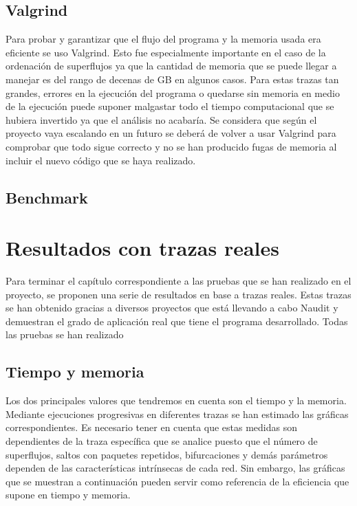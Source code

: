 \documentclass[twoside, 12pt]{epstfg}
\begin{document}
\subsection{Valgrind}
Para probar y garantizar que el flujo del programa y la memoria usada era eficiente se uso Valgrind. Esto fue especialmente importante en el caso de la ordenación de superflujos ya que la cantidad de memoria que se puede llegar a manejar es del rango de decenas de GB en algunos casos. Para estas trazas tan grandes, errores en la ejecución del programa o quedarse sin memoria en medio de la ejecución puede suponer malgastar todo el tiempo computacional que se hubiera invertido ya que el análisis no acabaría. Se considera que según el proyecto vaya escalando en un futuro se deberá de volver a usar Valgrind para comprobar que todo sigue correcto y no se han producido fugas de memoria al incluir el nuevo código que se haya realizado.

\subsection{Benchmark}

\section{Resultados con trazas reales}
Para terminar el capítulo correspondiente a las pruebas que se han realizado en el proyecto, se proponen una serie de resultados en base a trazas reales. Estas trazas se han obtenido gracias a diversos proyectos que está llevando a cabo Naudit y demuestran el grado de aplicación real que tiene el programa desarrollado. Todas las pruebas se han realizado

\subsection{Tiempo y memoria}
Los dos principales valores que tendremos en cuenta son el tiempo y la memoria. Mediante ejecuciones progresivas en diferentes trazas se han estimado las gráficas correspondientes. Es necesario tener en cuenta que estas medidas son dependientes de la traza específica que se analice puesto que el número de superflujos, saltos con paquetes repetidos, bifurcaciones y demás parámetros dependen de las características intrínsecas de cada red. Sin embargo, las gráficas que se muestran a continuación pueden servir como referencia de la eficiencia que supone en tiempo y memoria.
\end{document}
